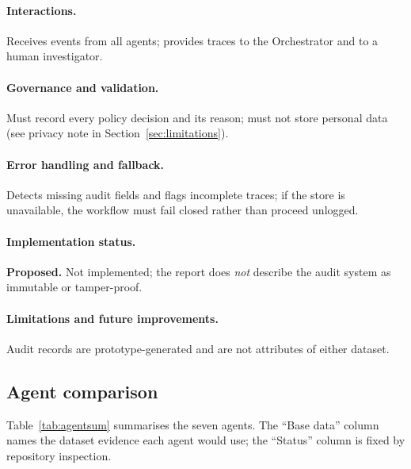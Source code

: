 \documentclass[11pt,a4paper]{article}
\begin{document}
\paragraph{Interactions.} Receives events from all agents; provides traces to the Orchestrator and to a human investigator.

\paragraph{Governance and validation.} Must record every policy decision and its reason; must not store personal data (see privacy note in Section~\ref{sec:limitations}).

\paragraph{Error handling and fallback.} Detects missing audit fields and flags incomplete traces; if the store is unavailable, the workflow must fail closed rather than proceed unlogged.

\paragraph{Implementation status.} \textbf{Proposed.} Not implemented; the report does \emph{not} describe the audit system as immutable or tamper-proof.

\paragraph{Limitations and future improvements.} Audit records are prototype-generated and are not attributes of either dataset.

\subsection{Agent comparison}
Table~\ref{tab:agentsum} summarises the seven agents. The ``Base data'' column names the dataset evidence each agent would use; the ``Status'' column is fixed by repository inspection.
\end{document}

